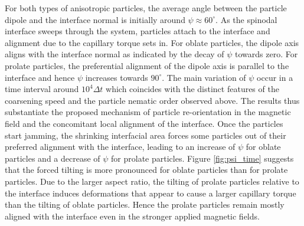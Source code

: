 For both types of anisotropic particles, the average angle between the
particle dipole and the interface normal is initially around
\(\psi\approx60^\circ\). As the spinodal interface sweeps through the
system, particles attach to the interface and alignment due to the
capillary torque sets in. For oblate particles, the dipole axis aligns
with the interface normal as indicated by the decay of \(\psi\) towards
zero. For prolate particles, the preferential alignment of the dipole
axis is parallel to the interface and hence \(\psi\) increases towards
\(90^\circ\). The main variation of \(\psi\) occur in a time interval
around \(10^4\Delta t\) which coincides with the distinct features of
the coarsening speed and the particle nematic order observed above. The
results thus substantiate the proposed mechanism of particle
re-orientation in the magnetic field and the concomitant local alignment
of the interface. Once the particles start jamming, the shrinking
interfacial area forces some particles out of their preferred alignment
with the interface, leading to an increase of \(\psi\) for oblate
particles and a decrease of \(\psi\) for prolate particles. Figure
\ref{fig:psi_time} suggests that the forced tilting is more pronounced
for oblate particles than for prolate particles. Due to the larger
aspect ratio, the tilting of prolate particles relative to the interface
induces deformations that appear to cause a larger capillary torque than
the tilting of oblate particles. %
Hence the prolate particles remain mostly aligned with the interface
even in the stronger applied magnetic fields.

